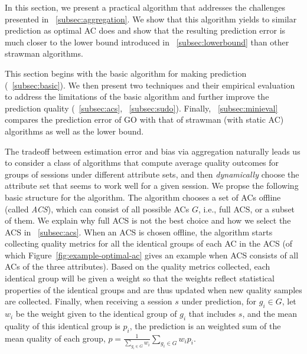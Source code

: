 \label{sec:prediction}
In this section, we present a practical algorithm that addresses the challenges presented in \Section~\ref{subsec:aggregation}. We show that this algorithm yields to similar prediction as optimal AC does and show that the resulting prediction error is much closer to the lower bound introduced in \Section~\ref{subsec:lowerbound} than other strawman algorithms.

This section begins with the basic algorithm for making prediction (\Section~\ref{subsec:basic}). We then present two techniques and their empirical evaluation to address the limitations of the basic algorithm and further improve the prediction quality (\Section~\ref{subsec:acs}, \Section~\ref{subsec:sudo}). Finally, \Section~\ref{subsec:minieval} compares the prediction error of GO with that of strawman (with static AC) algorithms as well as the lower bound.


\label{subsec:basic}
The tradeoff between estimation error and bias via aggregation naturally leads us to consider a class of algorithms that compute average quality outcomes for groups of sessions under different attribute sets, and then {\it dynamically} choose the attribute set that seems to work well for a given session. 
We propse the following basic structure for the algorithm. The algorithm chooses a set of ACs offline (called {\it ACS}), which can consist of all possible ACs $G$, i.e., full ACS, or a subset of them. 
We explain why full ACS is not the best choice and how we select the ACS in \Section~\ref{subsec:acs}. When an ACS is chosen offline, the algorithm starts collecting quality metrics for all the identical groups of each AC in the ACS 
(of which Figure~\ref{fig:example-optimal-ac} gives an example when ACS consists of all ACs of the three attributes). Based on the quality metrics collected, each identical group will be given a weight so that the weights reflect statistical properties of the identical groups and are thus updated when new quality samples are collected.
Finally, when receiving a session $s$ under prediction, for $g_i\in G$, let $w_i$ be the weight given to the identical group of $g_i$ that includes $s$, and the mean quality of this identical group is $p_i$,
the prediction is an weighted sum of the mean quality of each group, $p=\frac{1}{\sum_{g_i\in G} w_i}\sum_{g_i\in G} w_ip_i$.

